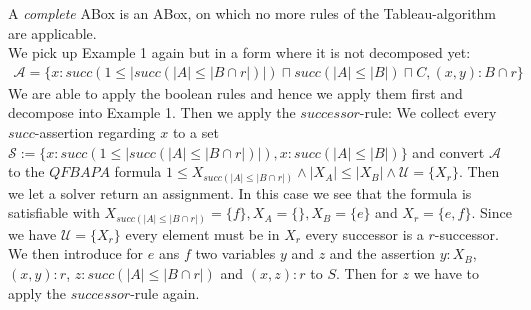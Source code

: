 \documentclass{book}
\theoremstyle{break}
\theoremstyle{definition}
\begin{document}
A \textit{complete} ABox is an ABox, on which no more rules of the Tableau-algorithm are applicable.\\
We pick up Example 1 again but in a form where it is not decomposed yet:
\begin{align*}
\mathcal{A}=\{x:succ(1\leq|succ(|A|\leq|B\cap r|)|)\sqcap succ(|A|\leq |B|)\sqcap C, (x,y):B\cap r\}
\end{align*}
We are able to apply the boolean rules and hence we apply them first and decompose into Example 1. Then we apply the $successor$-rule: We collect every $succ$-assertion regarding $x$ to a set $\mathcal{S}:=\{x:succ(1\leq|succ(|A|\leq|B\cap r|)|), x:succ(|A|\leq |B|)\}$ and convert $\mathcal{A}$ to the $QFBAPA$ formula $1\leq X_{succ(|A|\leq |B\cap r|)}\wedge|X_A|\leq |X_B|\wedge \mathcal{U}=\{X_r\}$. Then we let a solver return an assignment. In this case we see that the formula is satisfiable with $X_{succ(|A|\leq |B\cap r|)}=\{f\},X_A=\{\},X_B=\{e\}$ and $X_r=\{e,f\}$. Since we have $\mathcal{U}=\{X_r\}$ every element must be in $X_r$ every successor is a $r$-successor. We then introduce for $e$ ans $f$ two variables $y$ and $z$ and the assertion $y:X_B$, $(x,y):r$, $z:succ(|A|\leq|B\cap r|)$ and $(x,z):r$ to $S$. Then for $z$ we have to apply the $successor$-rule again.
\end{document}
